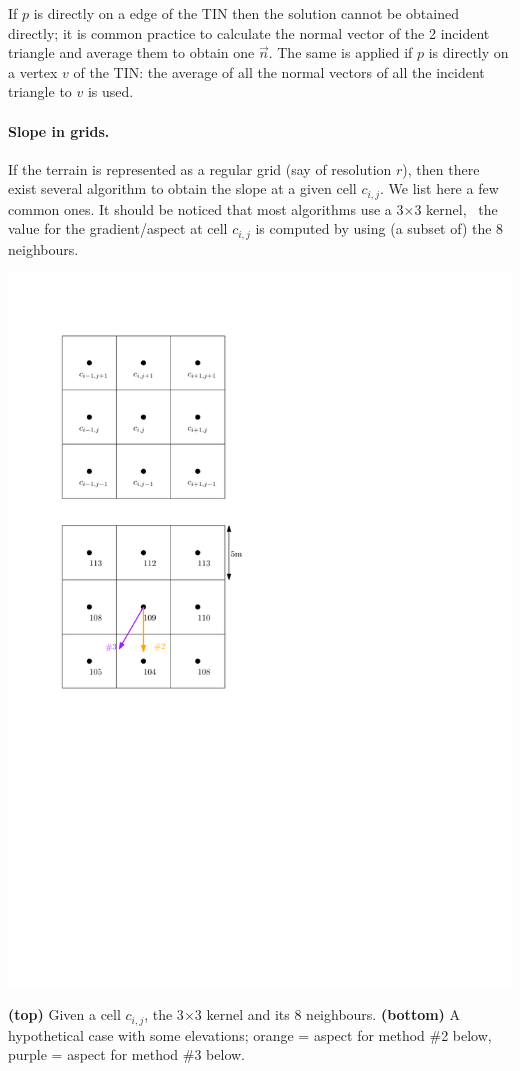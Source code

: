 If $p$ is directly on a edge of the TIN then the solution cannot be obtained directly; it is common practice to calculate the normal vector of the 2 incident triangle and average them to obtain one $\vec{n}$.
The same is applied if $p$ is directly on a vertex $v$ of the TIN: the average of all the normal vectors of all the incident triangle to $v$ is used.


\paragraph{Slope in grids.}

If the terrain is represented as a regular grid (say of resolution $r$), then there exist several algorithm to obtain the slope at a given cell $c_{i,j}$.
We list here a few common ones.
It should be noticed that most algorithms use a 3$\times$3 kernel, \ie\ the value for the gradient/aspect at cell $c_{i,j}$ is computed by using (a subset of) the 8 neighbours.
\begin{marginfigure}
  \centering
  \includegraphics[width=\linewidth]{figs/slope_grid}
  \caption{\textbf{(top)} Given a cell $c_{i,j}$, the 3$\times$3 kernel and its 8 neighbours. \textbf{(bottom)} A hypothetical case with some elevations; orange = aspect for method \#2 below, purple = aspect for method \#3 below.}%
\label{fig:slope_grid}
\end{marginfigure}


